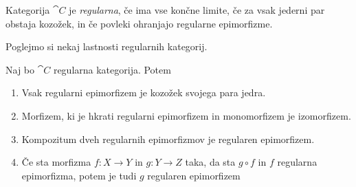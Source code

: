 \documentclass[../kategoricna_logika.tex]{subfiles}
\begin{document}
\begin{definicija}
    Kategorija $\cat{C}$ je \emph{regularna}, če ima vse končne limite,
    če za vsak jederni par obstaja kozožek, in če povleki ohranjajo regularne epimorfizme.
\end{definicija}
Poglejmo si nekaj lastnosti regularnih kategorij.
\begin{lema}
    Naj bo $\cat{C}$ regularna kategorija. Potem
    \begin{enumerate}[label=(\roman*), nosep]
        \item Vsak regularni epimorfizem je kozožek svojega para jedra.
        \item Morfizem, ki je hkrati regularni epimorfizem in monomorfizem je izo\-morfizem.
        \item Kompozitum dveh regularnih epimorfizmov je regularen epimorfizem.
        \item Če sta morfizma $f : X \to Y$ in $g : Y \to Z$ taka, da sta $g \circ f$ in $f$ regularna epimorfizma, potem je tudi $g$ regularen epimorfizem
    \end{enumerate}
\end{lema}
\noindent
\end{document}
